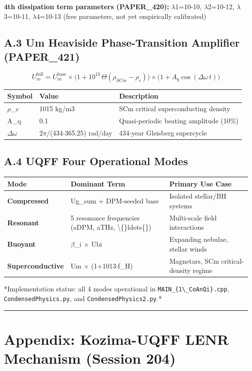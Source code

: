 \documentclass[11pt]{article}
\begin{document}
\textbf{4th dissipation term parameters (PAPER\_420):} $\lambda$1=10-10, $\lambda$2=10-12, $\lambda$3=10-11, $\lambda$4=10-13 (free parameters, not yet empirically calibrated)

\subsection*{A.3 Um Heaviside Phase-Transition Amplifier (PAPER\_421)}

$$U_m^{\mathrm{full}} = U_m^{\mathrm{base}} \times \bigl(1 + 10^{13}\,\Theta(\rho_{SCm} - \rho_c)\bigr) \times \bigl(1 + A_q\cos(\Delta\omega\,t)\bigr)$$

\begin{center}
\begin{longtable}{lll}
\toprule
Symbol & Value & Description \tabularnewline
\midrule
\endhead
$\rho$\_c & 1015 kg/m3 & SCm critical superconducting density \tabularnewline
A\_q & 0.1 & Quasi-periodic beating amplitude (10\%) \tabularnewline
$\Delta$$\omega$ & 2$\pi$/(434$\cdot$365.25) rad/day & 434-year Gleisberg supercycle \tabularnewline
\bottomrule
\end{longtable}
\end{center}

\subsection*{A.4 UQFF Four Operational Modes}

\begin{center}
\begin{longtable}{lll}
\toprule
Mode & Dominant Term & Primary Use Case \tabularnewline
\midrule
\endhead
\textbf{Compressed} & Ug\_sum + DPM-seeded base & Isolated stellar/BH systems \tabularnewline
\textbf{Resonant} & 5 resonance frequencies (aDPM, aTHz, \textbackslash\{\}ldots\{\}) & Multi-scale field interactions \tabularnewline
\textbf{Buoyant} & $\beta$\_i $\times$ Ubi & Expanding nebulae, stellar winds \tabularnewline
\textbf{Superconductive} & Um $\times$ (1+1013$\cdot$f\_H) & Magnetars, SCm critical-density regime \tabularnewline
\bottomrule
\end{longtable}
\end{center}

*Implementation status: all 4 modes operational in \verb|MAIN_{1\_CoAnQi}.cpp|, \verb|CondensedPhysics.py|, and \verb|CondensedPhysics2.py|.*

\noindent\rule{\textwidth}{0.4pt}

\section*{Appendix: Kozima-UQFF LENR Mechanism (Session 204)}
\end{document}
